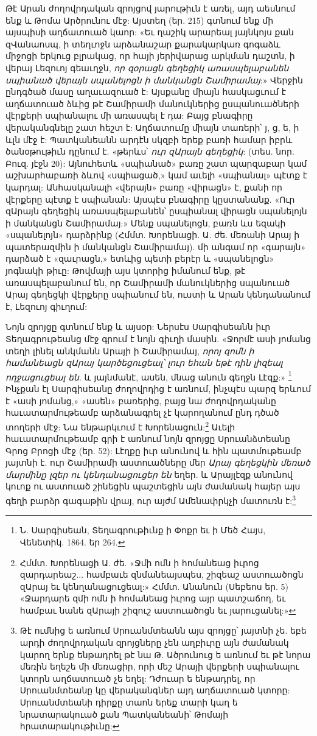 \documentclass{article}
\begin{document}
{Թէ Արան ժողովրդական զրոյցով յարութիւն է առել, այդ աեսնում ենք և Թոմա Արծրունու մէջ: Այստեղ (եր. 215) գտնում ենք մի այսպիսի աղճատուած կաոր: «Եւ ղաշիկ արարեալ յայնկոյս քան զՎանաոսպ, ի տեղւոջն արձանաշար քարակարկառ գոգաձև միջոցի երկուց բլրակաց, որ հայի յերիվարաց արկման դաշտն, ի վերայ Լեզուոյ գեաւղջն, \emph{որ զօրացն գեղեցիկ առասպելաբանեն սպիանած վերայն սպանելոցն ի մանկանցն Շամիրամայ}:» Վերջին ընդգծած մասը աղաւազուած է: Այսքանը միայն հասկացւում է աղճատուած ձևից թէ Շամիրամի մանուկներից ըսպանուածների վէրքերի սպիանալու մի առասպել է դա: Բայց բնագիրը վերականգնելը շատ հեշտ է: Աղճատումը միայն տառերի՝ յ, ց, ե, ի ևլն մէջ է: Պատկանեանն արդէն սկզբի երեք բառի համար իբրև ծանօթութիւն դընում է. «թերևս՝ \emph{ուր զԱրայն գեղեցիկ}: (տես. նոր. Բուզ. յէջն 20): Այնուհետև «սպիանած» բառը շատ պարզաբար կամ աշխարհաբառի ձևով «սպիացած,» կամ աւելի «սպիանալ» պէտք է կարդալ: Անհասկանալի «վերայն» բառը «վիրացն» է, քանի որ վէրքերը պէտք է սպիանան: Այսպէս բնագիրը կըստանանք. «Ուր զԱրայն գեղեցիկ առասպելաբանեն՝ ըսպիանալ վիրացն սպանելոյն ի մանկանցն Շամիրամայ:» Մենք սպանելոցն, բառն ևս եզակի «սպանելոյն» դարձրինք (Հմմտ. Խորենացի. Ա. ժե. մեռանի Արայ ի պատերազմին ի մանկանցն Շամիրամայ). մի անգամ որ «գարայն» դարձած է «զաւրացն,» ետևից պետի բերէր և «սպանելոցն» յոգնակի թիւը: Թովմայի այս կտորից իմանում ենք, թէ առասպելաբանում են, որ Շամիրամի մանուկներից սպանուած Արայ գեղեցկի վէրքերը սպիանում են, ուստի և Արան կենդանանում է, Լեզուոյ գիւղում:

Նոյն զրոյցը գտնում ենք և այսօր: Ներսէս Սարգիսեանն իւր Տեղագրութեանց մէջ գրում է նոյն գիւղի մասին. «Ջորմէ ասի յոմանց տեղի լինել անկմանն Արայի ի Շամիրամայ, \emph{որոյ զոմն ի համանեացն զԱրայ կարծեցուցեալ՝ լուր եհան եթէ դին լիզեալ ողջացուցեալ են}. և յայնմանէ, ասեն, մնաց անուն գեղջն Լէզք:» \footnote{Ն. Սարգիսեան, Տեղագրութիւնք ի Փոքր եւ ի Մեծ Հայս, Վենետիկ. 1864. եր 264.} Ինչքան էլ Սարգիսեանը ժողովրդից է առնում, ինչպէս պարզ երևում է «ասի յոմանց,» «ասեն» բառերից, բայց նա ժողովրդականը հաւատարմութեամբ արձանագրել չէ կարողանում ընդ դծած տողերի մէջ: Նա ենթարկւում է Խորենացուն:\footnote{Հմմտ. Խորենացի Ա. ժե. «Ջմի ոմն ի հոմանեաց իւրոց զարդարեաշ... համբաւե զնմանեայսպես, շիզեաշ աստուածոցն զԱրայ եւ կենղանացուցեալ:» Հմմտ. Անանուն (Սեբեոս եր. 5) «Ջարդարե զմի ոմն ի հոմանեաց իւրոց այր պատշաճող, եւ համբաւ նանե զԱրայի շիզուշ աստուածոցն եւ յարուցանել:»} Աւելի հաւատարմութեամբ գրի է առնում նոյն զրոյցը Սրուանձտեանը Գրոց Բրոցի մէջ (եր. 52): Լէղքը իւր անունով և հին պատմութեամբ յայտնի է. ուր Շամիրամի աստուածները մեր \emph{Արայ գեղեցկին մեռած մարմինը լզեր ու կենդանացուցեր են} եղեր. և Արայլէզք անունով կուոք ու աստուած շինեցին պաշտեցին այն ժամանակ հայեր այս գեղի բարձր գագաթին վրայ, ուր այժմ Ամենափրկչի մատուռն է:\footnote{Թէ ումնից ե առնում Սրուանմտեանն այս զրոյցը՝ յայտնի չե. եբե արդի ժողովրդական զրոյցները չեն աղբիւրը այն ժամանակ կարող երնք ենթադրել թէ նա Թ. Ածրունուց ե առնում եւ թէ նորա մեռին եղեշե մի մեռացիր, որի մեշ Արայի վերքերի սպիանալու կտորն աղճատուած չե եղել: Դժուար ե ենթադրել, որ Սրուանմտեանը կը վերականգներ այդ աղճատուած կտորը: Սրուանմտեանի դիրքը տաոն երեք տարի կաղ ե նրատարակուած քան Պատկանեանի՝ Թոմայի հրատարակութիւնը:}

}
\end{document}

